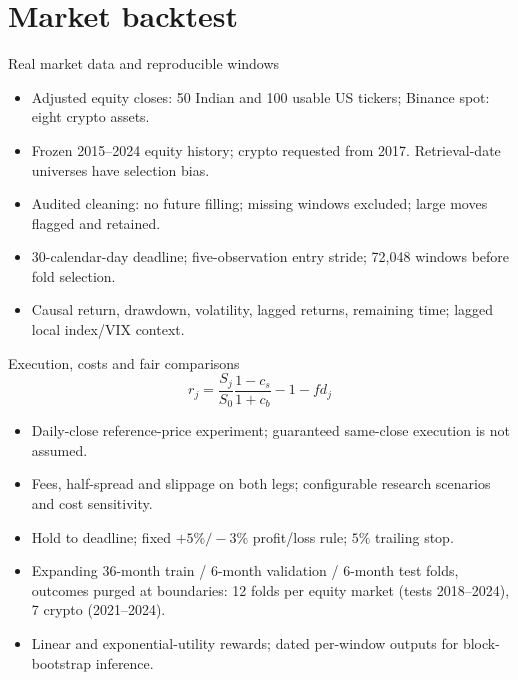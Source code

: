 \section{Market backtest}

\begin{frame}{Real market data and reproducible windows}
\begin{itemize}
\item Adjusted equity closes: 50 Indian and 100 usable US tickers; Binance spot: eight crypto assets.
\item Frozen 2015--2024 equity history; crypto requested from 2017. Retrieval-date universes have selection bias.
\item Audited cleaning: no future filling; missing windows excluded; large moves flagged and retained.
\item 30-calendar-day deadline; five-observation entry stride; 72,048 windows before fold selection.
\item Causal return, drawdown, volatility, lagged returns, remaining time; lagged local index/VIX context.
\end{itemize}
\end{frame}

\begin{frame}{Execution, costs and fair comparisons}
\[
r_j=\frac{S_j}{S_0}\frac{1-c_s}{1+c_b}-1-fd_j
\]
\begin{itemize}
\item Daily-close reference-price experiment; guaranteed same-close execution is not assumed.
\item Fees, half-spread and slippage on both legs; configurable research scenarios and cost sensitivity.
\item Hold to deadline; fixed $+5\%/-3\%$ profit/loss rule; $5\%$ trailing stop.
\item Expanding 36-month train / 6-month validation / 6-month test folds, outcomes purged at
  boundaries: 12 folds per equity market (tests 2018--2024), 7 crypto (2021--2024).
\item Linear and exponential-utility rewards; dated per-window outputs for block-bootstrap inference.
\end{itemize}
\end{frame}
